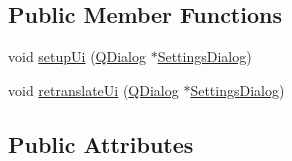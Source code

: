 \subsection*{Public Member Functions}
\begin{DoxyCompactItemize}
\item 
void \hyperlink{a00082_a4666ab89748eeb11cdb95d857bd02c6e}{setup\+Ui} (\hyperlink{a00051}{Q\+Dialog} $\ast$\hyperlink{a00075}{Settings\+Dialog})
\item 
void \hyperlink{a00082_a7a0adf32eef516ceffcc0633a90c3b34}{retranslate\+Ui} (\hyperlink{a00051}{Q\+Dialog} $\ast$\hyperlink{a00075}{Settings\+Dialog})
\end{DoxyCompactItemize}
\subsection*{Public Attributes}
